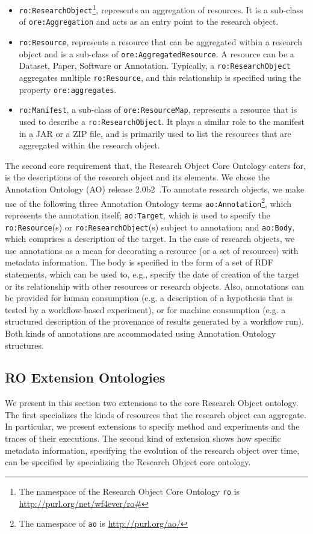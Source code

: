 \begin{itemize}
\item
\texttt{ro:ResearchObject}\footnote{The namespace of the Research Object Core Ontology \texttt{ro} is \url{http://purl.org/net/wf4ever/ro\#}}, represents an aggregation of resources. It is a sub-class of \texttt{ore:Aggregation} and acts as an entry point to the research object.
\item
\texttt{ro:Resource}, represents a resource that can be aggregated within a research object and is a sub-class of \texttt{ore:AggregatedResource}. A resource can be a Dataset, Paper, Software or Annotation. Typically, a \texttt{ro:ResearchObject} aggregates multiple \texttt{ro:Resource}, and this relationship is specified using the property \texttt{ore:aggregates}.
\item
\texttt{ro:Manifest}, a sub-class of \texttt{ore:ResourceMap}, represents a resource that is used to describe a \texttt{ro:ResearchObject}. It plays a similar role to the manifest in a JAR or a ZIP file, and is primarily used to list the resources that are aggregated within the research object.
\end{itemize}

The second core requirement that, the Research Object Core Ontology caters for, is the descriptions of the research object and its elements. We chose the Annotation Ontology (AO) release 2.0b2~\cite{COG11}.To annotate research objects, we make use of the following three Annotation Ontology terms \texttt{ao:Annotation}\footnote{The namespace of \texttt{ao} is \url{http://purl.org/ao/}}, which represents the annotation itself; \texttt{ao:Target}, which is used to specify the \texttt{ro:Resource}(s) or \texttt{ro:ResearchObject}(s) subject to annotation; and \texttt{ao:Body}, which comprises a description of the target.
In the case of research objects, we use annotations as a mean for decorating a resource (or a set of resources) with metadata information. The body is specified in the form of a set of RDF statements, which can be used to, e.g., specify  the date of creation of the target or its relationship with other resources or research objects. Also, annotations can be provided for human consumption (e.g. a description of a hypothesis that is tested by a workflow-based experiment), or for machine consumption (e.g. a structured description of the provenance of results generated by a workflow run). Both kinds of annotations are accommodated using Annotation Ontology structures.

\subsection{RO Extension Ontologies}
We present in this section two  extensions to the core Research Object ontology. The first specializes the kinds of resources that the research object can aggregate. In particular, we present extensions to specify  method and experiments and the traces of their executions. The second kind of extension shows how specific metadata information, specifying the evolution of the research object over time, can be specified by specializing the Research Object core ontology.

